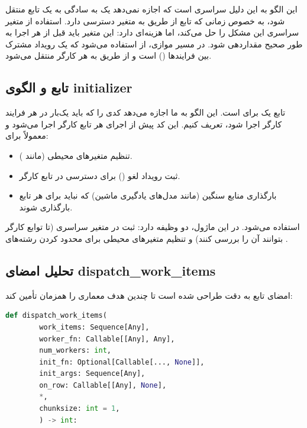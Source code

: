 این الگو به این دلیل سراسری است که  اجازه نمی‌دهد یک  به سادگی به یک تابع  منتقل شود، به خصوص زمانی که تابع از طریق  به متغیر دسترسی دارد. استفاده از متغیر سراسری این مشکل را حل می‌کند، اما هزینه‌ای دارد: این متغیر باید قبل از هر اجرا به طور صحیح مقداردهی شود. در مسیر موازی، از  استفاده می‌شود که یک رویداد مشترک بین فرایندها () است و از طریق  به هر کارگر منتقل می‌شود.

\subsection{تابع  و الگوی initializer}

تابع  یک  برای  است. این الگو به ما اجازه می‌دهد کدی را که باید یک‌بار در هر فرایند کارگر اجرا شود، تعریف کنیم. این کد پیش از اجرای هر تابع کارگر اجرا می‌شود و معمولاً برای:

\begin{itemize}
	\item تنظیم متغیرهای محیطی (مانند ).
	\item ثبت رویداد لغو () برای دسترسی در تابع کارگر.
	\item بارگذاری منابع سنگین (مانند مدل‌های یادگیری ماشین) که نباید برای هر تابع بارگذاری شوند.
\end{itemize}

استفاده می‌شود. در این ماژول،  دو وظیفه دارد: ثبت  در متغیر سراسری  (تا توابع کارگر بتوانند آن را بررسی کنند) و تنظیم متغیرهای محیطی برای محدود کردن رشته‌های .

\subsection{تحلیل امضای dispatch\_work\_items}

امضای تابع  به دقت طراحی شده است تا چندین هدف معماری را همزمان تأمین کند:

\begin{LTR}
	\begin{lstlisting}[language=Python]
		def dispatch_work_items(
		work_items: Sequence[Any],
		worker_fn: Callable[[Any], Any],
		num_workers: int,
		init_fn: Optional[Callable[..., None]],
		init_args: Sequence[Any],
		on_row: Callable[[Any], None],
		*,
		chunksize: int = 1,
		) -> int:
	\end{lstlisting}
\end{LTR}

